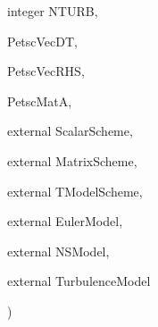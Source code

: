 {{\begin{DoxyParamCaption}
\item[{integer}]{N\-T\-U\-R\-B, }
\item[{}]{Petsc\-Vec\-D\-T, }
\item[{}]{Petsc\-Vec\-R\-H\-S, }
\item[{}]{Petsc\-Mat\-A, }
\item[{external}]{Scalar\-Scheme, }
\item[{external}]{Matrix\-Scheme, }
\item[{external}]{T\-Model\-Scheme, }
\item[{external}]{Euler\-Model, }
\item[{external}]{N\-S\-Model, }
\item[{external}]{Turbulence\-Model}
\end{DoxyParamCaption}
)}}\label{seq_2setup_r_h_s_8_f_a718e288d437007ef5bc48b3f57941f65}
